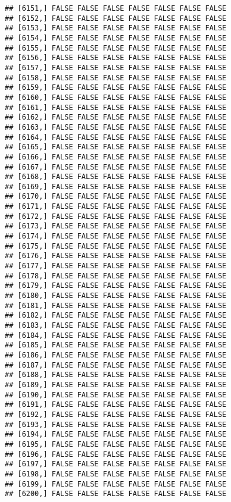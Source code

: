 \documentclass[
]{article}
\begin{document}
\begin{verbatim}
## [6151,] FALSE FALSE FALSE FALSE FALSE FALSE FALSE
## [6152,] FALSE FALSE FALSE FALSE FALSE FALSE FALSE
## [6153,] FALSE FALSE FALSE FALSE FALSE FALSE FALSE
## [6154,] FALSE FALSE FALSE FALSE FALSE FALSE FALSE
## [6155,] FALSE FALSE FALSE FALSE FALSE FALSE FALSE
## [6156,] FALSE FALSE FALSE FALSE FALSE FALSE FALSE
## [6157,] FALSE FALSE FALSE FALSE FALSE FALSE FALSE
## [6158,] FALSE FALSE FALSE FALSE FALSE FALSE FALSE
## [6159,] FALSE FALSE FALSE FALSE FALSE FALSE FALSE
## [6160,] FALSE FALSE FALSE FALSE FALSE FALSE FALSE
## [6161,] FALSE FALSE FALSE FALSE FALSE FALSE FALSE
## [6162,] FALSE FALSE FALSE FALSE FALSE FALSE FALSE
## [6163,] FALSE FALSE FALSE FALSE FALSE FALSE FALSE
## [6164,] FALSE FALSE FALSE FALSE FALSE FALSE FALSE
## [6165,] FALSE FALSE FALSE FALSE FALSE FALSE FALSE
## [6166,] FALSE FALSE FALSE FALSE FALSE FALSE FALSE
## [6167,] FALSE FALSE FALSE FALSE FALSE FALSE FALSE
## [6168,] FALSE FALSE FALSE FALSE FALSE FALSE FALSE
## [6169,] FALSE FALSE FALSE FALSE FALSE FALSE FALSE
## [6170,] FALSE FALSE FALSE FALSE FALSE FALSE FALSE
## [6171,] FALSE FALSE FALSE FALSE FALSE FALSE FALSE
## [6172,] FALSE FALSE FALSE FALSE FALSE FALSE FALSE
## [6173,] FALSE FALSE FALSE FALSE FALSE FALSE FALSE
## [6174,] FALSE FALSE FALSE FALSE FALSE FALSE FALSE
## [6175,] FALSE FALSE FALSE FALSE FALSE FALSE FALSE
## [6176,] FALSE FALSE FALSE FALSE FALSE FALSE FALSE
## [6177,] FALSE FALSE FALSE FALSE FALSE FALSE FALSE
## [6178,] FALSE FALSE FALSE FALSE FALSE FALSE FALSE
## [6179,] FALSE FALSE FALSE FALSE FALSE FALSE FALSE
## [6180,] FALSE FALSE FALSE FALSE FALSE FALSE FALSE
## [6181,] FALSE FALSE FALSE FALSE FALSE FALSE FALSE
## [6182,] FALSE FALSE FALSE FALSE FALSE FALSE FALSE
## [6183,] FALSE FALSE FALSE FALSE FALSE FALSE FALSE
## [6184,] FALSE FALSE FALSE FALSE FALSE FALSE FALSE
## [6185,] FALSE FALSE FALSE FALSE FALSE FALSE FALSE
## [6186,] FALSE FALSE FALSE FALSE FALSE FALSE FALSE
## [6187,] FALSE FALSE FALSE FALSE FALSE FALSE FALSE
## [6188,] FALSE FALSE FALSE FALSE FALSE FALSE FALSE
## [6189,] FALSE FALSE FALSE FALSE FALSE FALSE FALSE
## [6190,] FALSE FALSE FALSE FALSE FALSE FALSE FALSE
## [6191,] FALSE FALSE FALSE FALSE FALSE FALSE FALSE
## [6192,] FALSE FALSE FALSE FALSE FALSE FALSE FALSE
## [6193,] FALSE FALSE FALSE FALSE FALSE FALSE FALSE
## [6194,] FALSE FALSE FALSE FALSE FALSE FALSE FALSE
## [6195,] FALSE FALSE FALSE FALSE FALSE FALSE FALSE
## [6196,] FALSE FALSE FALSE FALSE FALSE FALSE FALSE
## [6197,] FALSE FALSE FALSE FALSE FALSE FALSE FALSE
## [6198,] FALSE FALSE FALSE FALSE FALSE FALSE FALSE
## [6199,] FALSE FALSE FALSE FALSE FALSE FALSE FALSE
## [6200,] FALSE FALSE FALSE FALSE FALSE FALSE FALSE

\end{verbatim}
\end{document}
